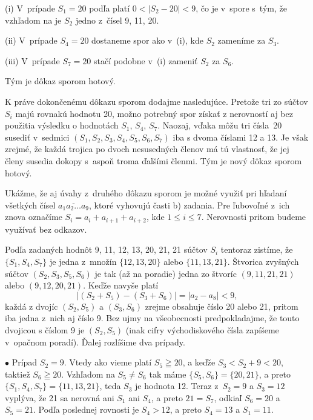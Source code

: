 {\item{(i)} V~prípade $S_1=20$ podľa  platí $0<|S_2-20|<9$, čo je v~spore s~tým, že vzhľadom na  je $S_2$ jedno z~čísel 9, 11, 20.
\item{(ii)} V~prípade $S_4=20$ dostaneme spor ako v~(i), kde $S_2$ zameníme za $S_3$.
\item{(iii)} V~prípade $S_7=20$ stačí podobne v~(i) zameniť $S_2$ za $S_6$.

Tým je dôkaz sporom hotový.

\poznamka
K práve dokončenému dôkazu sporom dodajme
nasledujúce. Pretože tri zo súčtov $S_i$ majú rovnakú hodnotu 20,
možno potrebný spor získať z nerovností  aj bez použitia výsledku 
o hodnotách $S_1$, $S_4$, $S_7$. Naozaj, vďaka  môžu
tri čísla~20 susediť v~sedmici $(S_1,S_2,S_3,S_4,S_5,S_6,S_7)$
iba s dvoma číslami 12 a 13. Je však zrejmé, že každá trojica
po dvoch nesusedných členov má tú vlastnosť, že jej členy susedia dokopy
s~aspoň troma ďalšími členmi. Tým je nový dôkaz sporom hotový.

\poznamka
Ukážme, že aj úvahy z~druhého dôkazu sporom
je možné využiť pri hľadaní všetkých čísel
$\overline{a_1a_2 \dots a_9}$, ktoré vyhovujú
časti b) zadania. Pre ľubovoľné z~ich
znova označíme $S_i=a_i+a_{i+1}+a_{i+2}$, kde $1\leq i\leq7$.
Nerovnosti  pritom budeme využívať bez odkazov.

Podľa zadaných hodnôt 9, 11, 12, 13, 20, 21, 21 súčtov $S_i$
tentoraz zistíme, že $\{S_1,S_4,S_7\}$ je jedna z~množín
$\{12,13,20\}$ alebo $\{11,13,21\}$. Štvorica zvyšných súčtov
$(S_2,S_3,S_5,S_6)$ je tak (až na poradie) jedna zo štvoríc
$(9,11,21,21)$ alebo $(9,12,20,21)$. Keďže navyše platí
$$
|(S_2+S_5)-(S_3+S_6)|=|a_2-a_8|<9,
$$
každá z dvojíc $(S_2,S_5)$ a $(S_3,S_6)$ zrejme obsahuje číslo
20 alebo 21, pritom iba jedna z~nich aj číslo 9. Bez ujmy
na všeobecnosti predpokladajme, že touto dvojicou s číslom 9 je $(S_2,S_5)$ (inak
cifry východiskového čísla zapíšeme v~opačnom poradí). Ďalej
rozlíšime dva prípady.

\smallskip
$\bullet$ Prípad $S_2=9$. Vtedy ako vieme platí $S_5\geqq 20$,
a keďže $S_3<S_2+9<20$, taktiež $S_6\geqq20$.
Vzhľadom na $S_5\ne S_6$ tak máme $\{S_5,S_6\}=\{20,21\}$, a preto
$\{S_1,S_4,S_7\}=\{11,13,21\}$, teda $S_3$ je  hodnota
12. Teraz z~$S_2=9$ a $S_3=12$ vyplýva, že 21 sa nerovná ani $S_1$
ani $S_4$, a preto $21=S_7$, odkiaľ $S_6=20$ a $S_5=21$.
Podľa poslednej rovnosti je $S_4>12$, a preto $S_4=13$ a $S_1=11$.

}
